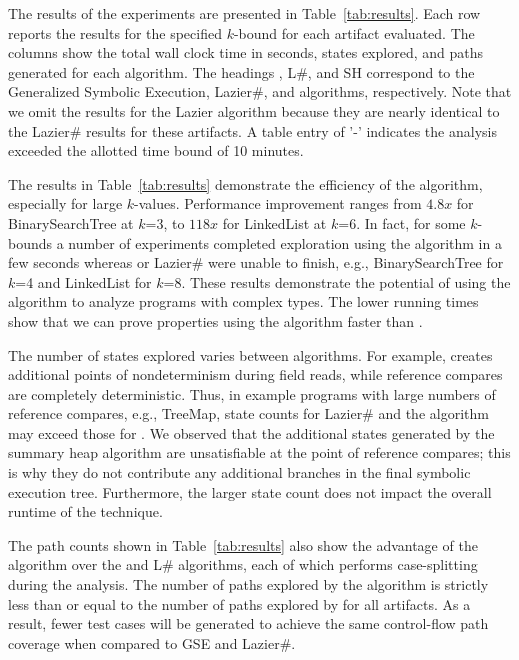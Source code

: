 The results of the experiments are presented in Table~\ref{tab:results}. 
Each row reports the results for the specified $k$-bound 
for each artifact evaluated. The columns show the total
wall clock time in seconds, states explored, and paths generated for
each algorithm. The headings \gsetxt{}, L\#, and SH correspond
to the Generalized Symbolic Execution, Lazier\#, and \symtxt{}
algorithms, respectively. Note that we omit the results for
the Lazier algorithm because they are nearly identical to the Lazier\#
results for these artifacts. A table entry of  '-' indicates the analysis
exceeded the allotted time bound of 10 minutes.

The results in Table~\ref{tab:results} demonstrate the efficiency of the 
\symtxt{} algorithm, especially for
large $k$-values. Performance improvement ranges from $4.8x$ for
BinarySearchTree at $k$=3, to $118x$ for LinkedList at $k$=6. In fact,
for some $k$-bounds a number of experiments completed exploration
using the \symtxt{} algorithm in a few seconds whereas \gsetxt{} or Lazier\# were
unable to finish, e.g., BinarySearchTree for $k$=4 and LinkedList for
$k$=8. These results demonstrate the potential of using the \symtxt{} algorithm 
to analyze programs with complex types. The lower running times
show that we can prove properties using the \symtxt{} algorithm 
faster than \gsetxt{}.

The number of states explored varies between algorithms. For example,
\gsetxt{} creates additional points of nondeterminism during field reads, 
while reference compares are completely deterministic. Thus, in
example programs with large numbers of reference compares, e.g.,
TreeMap, state counts for Lazier\# and the \symtxt{} algorithm may
exceed those for \gsetxt{}. We observed that the additional states
generated by the summary heap algorithm are unsatisfiable at the point
of reference compares; this is why they do not contribute any
additional branches in the final symbolic execution tree. Furthermore,
the larger state count does not impact the overall runtime of the
technique.


The path counts shown in Table~\ref{tab:results} also show the advantage
of the \symtxt{} algorithm over the \gsetxt{} and L\# algorithms, each of
which performs case-splitting during the analysis.
The number of paths explored by the \symtxt{} algorithm is strictly 
less than or equal to the number
of paths explored by \gsetxt{} for all artifacts. As a result,
fewer test cases will be generated to achieve the same control-flow 
path coverage when compared to GSE and Lazier\#.

